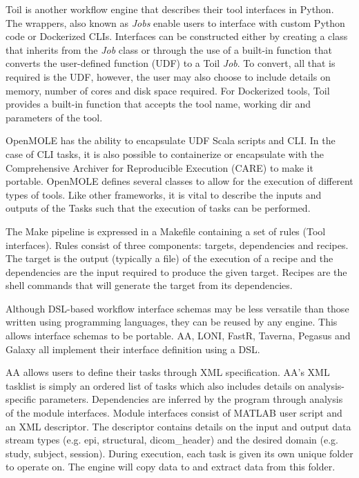             Toil is another workflow engine that describes their tool interfaces
            in Python. The wrappers, also known as \textit{Jobs} enable users to
            interface with custom Python code or Dockerized
            \cite{merkel2014docker} CLIs. Interfaces can be constructed either
            by creating a class that inherits from the \textit{Job} class or
            through the use of a built-in function that converts the
            user-defined function (UDF) to a Toil \textit{Job}. To convert, all
            that is required is the UDF, however, the user may also choose to
            include details on memory, number of cores and disk space required.
            For Dockerized tools, Toil provides a built-in function that accepts
            the tool name, working dir and parameters of the tool.

            OpenMOLE has the ability to encapsulate UDF Scala scripts and CLI.
            In the case of CLI tasks, it is also possible to containerize or
            encapsulate with the Comprehensive Archiver for Reproducible
            Execution (CARE) \cite{Janin:2014:CCA:2618137.2618138} to make it
            portable. OpenMOLE defines several classes to allow for the
            execution of different types of tools. Like other frameworks, it is
            vital to describe the inputs and outputs of the Tasks such that the
            execution of tasks can be performed. 

            The Make pipeline is expressed in a Makefile containing a set of
            rules (Tool interfaces). Rules consist of three components: targets,
            dependencies and recipes. The target is the output (typically a
            file) of the execution of a recipe and the dependencies are the
            input required to produce the given target. Recipes are the shell
            commands that will generate the target from its dependencies. 

            Although DSL-based workflow interface schemas may be less versatile
            than those written using programming languages, they can be reused
            by any engine. This allows interface schemas to be portable. AA,
            LONI, FastR, Taverna, Pegasus and Galaxy all implement their
            interface definition using a DSL.

            AA allows users to define their tasks through XML specification.
            AA's XML tasklist is simply an ordered list of tasks which also
            includes details on analysis-specific parameters. Dependencies are
            inferred by the program through analysis of the module interfaces.
            Module interfaces consist of MATLAB user script and an XML
            descriptor. The descriptor contains details on the input and output
            data stream types (e.g. epi, structural, dicom\_header) and the
            desired domain (e.g. study, subject, session). During execution,
            each task is given its own unique folder to operate on. The engine
            will copy data to and extract data from this folder.

